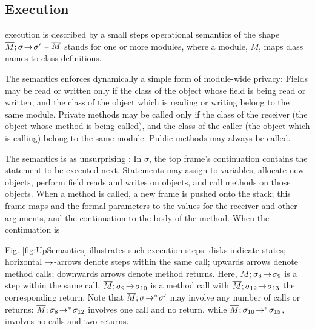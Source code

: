 {  

  
\subsection{\LangOO Execution}
\label{sect:execution}

 \LangOO execution is described by a small steps operational semantics of the shape $\overline{M};\sigma\! \rightarrow\! {\sigma'}$ 
 --  
  $\overline{M}$ stands for one or more modules, where a
  module,  $M$, maps class names to class definitions. 
   
{The semantics enforces dynamically a simple form of module-wide privacy: 
Fields may be read or written only if the class of the object whose field is being read or written, and the class of the object which is reading or writing belong to the same module.}
Private methods may be called only if the class of the receiver (the object whose method is being called), and the class of the caller (the object which is calling) belong to the same module.
Public methods may always be called.

The semantics is as unsurprising :  
In $\sigma$, the  top frame's continuation contains the statement to be  executed next.  
 Statements may assign to variables, allocate new objects, 
perform field reads and writes on objects, and
 call methods on those objects. 
When a method is called, a new frame is pushed onto the stack; this frame  maps  and the formal parameters to  the values for the receiver and other arguments, and the continuation to the body of the method. 
 When the continuation is 


{Fig. \ref{fig:UpSemantics} illustrates  such  execution steps:  disks indicate states;
 horizontal $\rightarrow$-arrows denote   steps  within the same  call; upwards arrows denote  method calls;
 downwards arrows denote method returns. %
 Here,   $\overline{M};\sigma_8\! \rightarrow\! {\sigma_9} $ is a step within the same call, $\overline{M};\sigma_9\! \rightarrow\! {\sigma_{10}} $ is a method call   
with $\overline{M};\sigma_{12}\! \rightarrow\! {\sigma_{13}} $ %
the corresponding return. 
 {Note that  $\overline{M};\sigma\! \rightarrow^*\! {\sigma'}$ may involve  any number of  calls or returns: 
 $\overline{M};\sigma_8\! \rightarrow^*\! {\sigma_{12}}$ involves one call and no return,
while $\overline{M};\sigma_{10}\! \rightarrow^*\! {\sigma_{15}}$,   involves no calls and two returns.
}
} 

}
